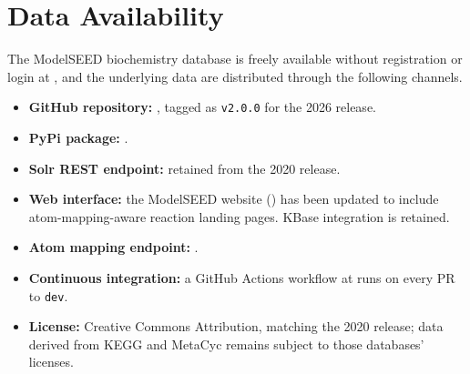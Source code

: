 \section{Data Availability}

The ModelSEED biochemistry database is freely available without registration or
login at \modelseedurl{}, and the underlying data are distributed through the
following channels.

\begin{itemize}
  \item \textbf{GitHub repository:} \repourl{}, tagged as \texttt{v2.0.0} for the
        2026 release.
  \item \textbf{PyPi package:} \TBD[\texttt{modelseed-biochem==2.0.0}].
  \item \textbf{Solr REST endpoint:} retained from the 2020 release.
  \item \textbf{Web interface:} the ModelSEED website () has been
        updated to include atom-mapping-aware reaction landing pages. KBase
        integration is retained.
  \item \textbf{Atom mapping endpoint:} .
  \item \textbf{Continuous integration:} a GitHub Actions workflow at
         runs on every PR to \texttt{dev}.
  \item \textbf{License:} Creative Commons Attribution, matching the 2020
        release; data derived from KEGG and MetaCyc remains subject to those
        databases' licenses.
\end{itemize}

